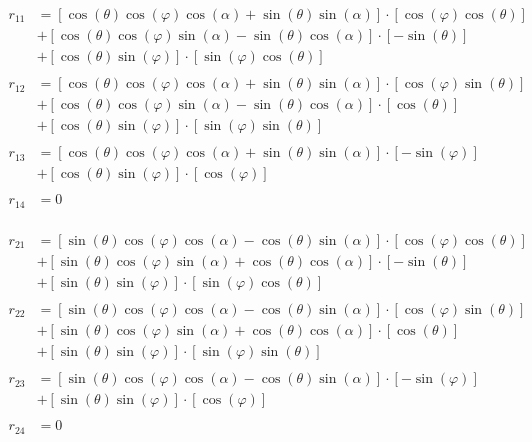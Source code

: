 \documentclass[a4paper]{article}
\theoremstyle{hangindent}
\theoremstyle{hangindent}
\begin{document}
\begin{align*}
    r_{11}
    &= \left[ \cos(\theta)\cos(\varphi)\cos(\alpha) + \sin(\theta)\sin(\alpha) \right] \cdot \left[\cos(\varphi)\cos(\theta)\right] \\
    &+ \left[ \cos(\theta)\cos(\varphi)\sin(\alpha) - \sin(\theta)\cos(\alpha) \right] \cdot \left[-\sin(\theta)\right] \\
    &+ \left[\cos(\theta)\sin(\varphi)\right] \cdot \left[\sin(\varphi)\cos(\theta)\right] \\
    \\
    r_{12}
    &= \left[ \cos(\theta)\cos(\varphi)\cos(\alpha) + \sin(\theta)\sin(\alpha) \right] \cdot \left[ \cos(\varphi)\sin(\theta) \right] \\
    &+ \left[ \cos(\theta)\cos(\varphi)\sin(\alpha) - \sin(\theta)\cos(\alpha) \right] \cdot \left[\cos(\theta)\right] \\
    &+ \left[\cos(\theta)\sin(\varphi)\right] \cdot \left[\sin(\varphi)\sin(\theta)\right] \\
    \\
    r_{13}
    &= \left[ \cos(\theta)\cos(\varphi)\cos(\alpha) + \sin(\theta)\sin(\alpha) \right] \cdot \left[-\sin(\varphi)\right] \\
    &+ \left[\cos(\theta)\sin(\varphi)\right] \cdot \left[\cos(\varphi)\right] \\
    \\
    r_{14} &= 0 \\
\end{align*}

\begin{align*}
    r_{21}
    &= \left[ \sin(\theta)\cos(\varphi)\cos(\alpha) - \cos(\theta)\sin(\alpha) \right] \cdot \left[\cos(\varphi)\cos(\theta)\right] \\
    &+ \left[ \sin(\theta)\cos(\varphi)\sin(\alpha) + \cos(\theta)\cos(\alpha) \right] \cdot \left[-\sin(\theta)\right] \\
    &+ \left[\sin(\theta)\sin(\varphi)\right] \cdot \left[\sin(\varphi)\cos(\theta)\right] \\
    \\
    r_{22}
    &= \left[ \sin(\theta)\cos(\varphi)\cos(\alpha) - \cos(\theta)\sin(\alpha) \right] \cdot \left[\cos(\varphi)\sin(\theta)\right] \\
    &+ \left[ \sin(\theta)\cos(\varphi)\sin(\alpha) + \cos(\theta)\cos(\alpha) \right] \cdot \left[\cos(\theta)\right] \\
    &+ \left[\sin(\theta)\sin(\varphi)\right] \cdot \left[\sin(\varphi)\sin(\theta)\right] \\
    \\
    r_{23}
    &= \left[ \sin(\theta)\cos(\varphi)\cos(\alpha) - \cos(\theta)\sin(\alpha) \right] \cdot \left[-\sin(\varphi)\right] \\
    &+ \left[\sin(\theta)\sin(\varphi)\right] \cdot \left[\cos(\varphi)\right] \\
    \\
    r_{24} &= 0 \\
    \\
\end{align*}
\end{document}
